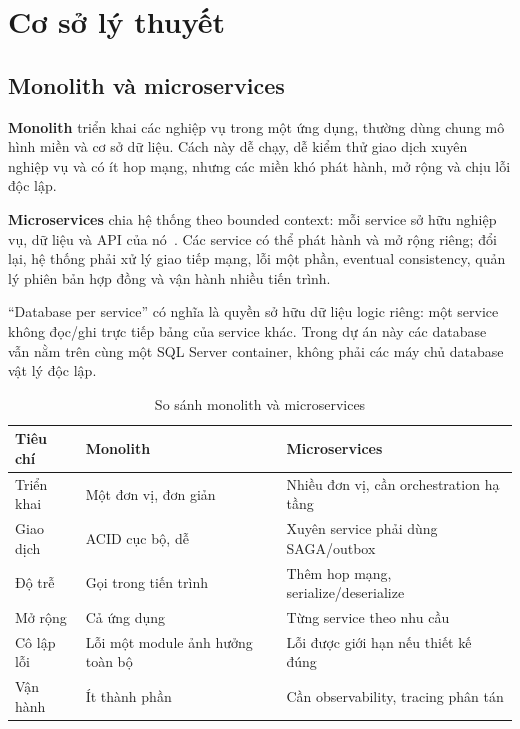 \section{Cơ sở lý thuyết}
\label{ch:theory}

\subsection{Monolith và microservices}

\textbf{Monolith} triển khai các nghiệp vụ trong một ứng dụng, thường dùng chung mô hình miền và cơ sở dữ liệu. Cách này dễ chạy, dễ kiểm thử giao dịch xuyên nghiệp vụ và có ít hop mạng, nhưng các miền khó phát hành, mở rộng và chịu lỗi độc lập.

\textbf{Microservices} chia hệ thống theo bounded context: mỗi service sở hữu nghiệp vụ, dữ liệu và API của nó~\cite{newman2021,richardson2018}. Các service có thể phát hành và mở rộng riêng; đổi lại, hệ thống phải xử lý giao tiếp mạng, lỗi một phần, eventual consistency, quản lý phiên bản hợp đồng và vận hành nhiều tiến trình.

``Database per service'' có nghĩa là quyền sở hữu dữ liệu logic riêng: một service không đọc/ghi trực tiếp bảng của service khác. Trong dự án này các database vẫn nằm trên cùng một SQL Server container, không phải các máy chủ database vật lý độc lập.

\begin{table}[!t]
\centering
\caption{So sánh monolith và microservices}
\label{tab:mono-vs-micro}
\small
\begin{tabularx}{\linewidth}{@{}L{1.6cm}YY@{}}
\toprule
\textbf{Tiêu chí} & \textbf{Monolith} & \textbf{Microservices} \\
\midrule
Triển khai & Một đơn vị, đơn giản & Nhiều đơn vị, cần orchestration hạ tầng \\
Giao dịch & ACID cục bộ, dễ & Xuyên service phải dùng SAGA/outbox \\
Độ trễ & Gọi trong tiến trình & Thêm hop mạng, serialize/deserialize \\
Mở rộng & Cả ứng dụng & Từng service theo nhu cầu \\
Cô lập lỗi & Lỗi một module ảnh hưởng toàn bộ & Lỗi được giới hạn nếu thiết kế đúng \\
Vận hành & Ít thành phần & Cần observability, tracing phân tán \\
\bottomrule
\end{tabularx}
\end{table}

